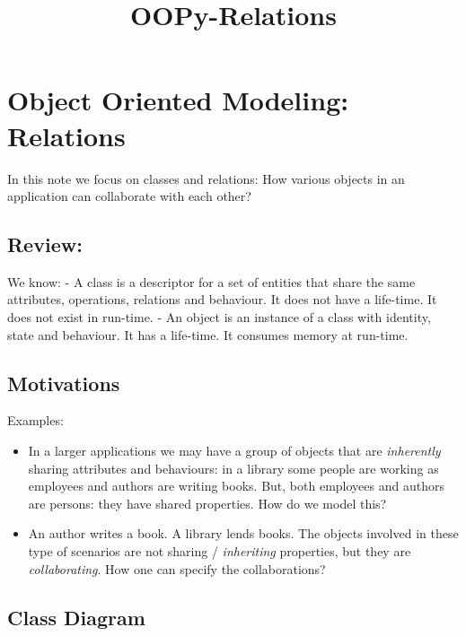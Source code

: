 \documentclass[11pt]{article}
\title{OOPy-Relations}
\begin{document}
    
    
    \maketitle
    
    

    
    \section{Object Oriented Modeling:
Relations}\label{object-oriented-modeling-relations}

In this note we focus on classes and relations: How various objects in
an application can collaborate with each other?

    \subsection{Review:}\label{review}

We know: - A class is a descriptor for a set of entities that share the
same attributes, operations, relations and behaviour. It does not have a
life-time. It does not exist in run-time. - An object is an instance of
a class with identity, state and behaviour. It has a life-time. It
consumes memory at run-time.

    \subsection{Motivations}\label{motivations}

Examples:

\begin{itemize}
\item
  In a larger applications we may have a group of objects that are
  \emph{inherently} sharing attributes and behaviours: in a library some
  people are working as employees and authors are writing books. But,
  both employees and authors are persons: they have shared properties.
  How do we model this?
\item
  An author writes a book. A library lends books. The objects involved
  in these type of scenarios are not sharing / \emph{inheriting}
  properties, but they are \emph{collaborating}. How one can specify the
  collaborations?
\end{itemize}

    \subsection{Class Diagram}\label{class-diagram}
\end{document}
